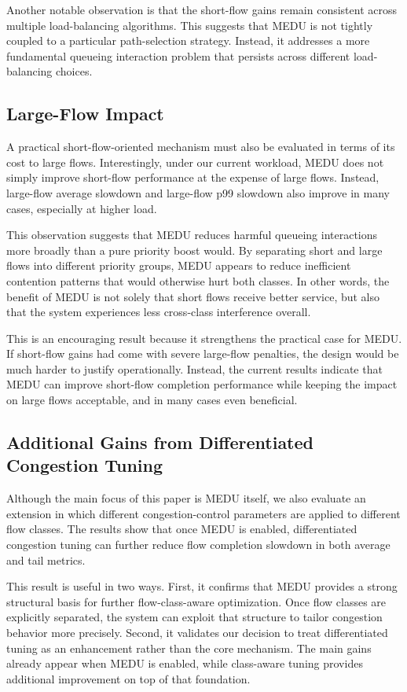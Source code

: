 \documentclass[conference]{IEEEtran}
\begin{document}
Another notable observation is that the short-flow gains remain consistent across multiple load-balancing algorithms. This suggests that MEDU is not tightly coupled to a particular path-selection strategy. Instead, it addresses a more fundamental queueing interaction problem that persists across different load-balancing choices.

\subsection{Large-Flow Impact}

A practical short-flow-oriented mechanism must also be evaluated in terms of its cost to large flows. Interestingly, under our current workload, MEDU does not simply improve short-flow performance at the expense of large flows. Instead, large-flow average slowdown and large-flow p99 slowdown also improve in many cases, especially at higher load.

This observation suggests that MEDU reduces harmful queueing interactions more broadly than a pure priority boost would. By separating short and large flows into different priority groups, MEDU appears to reduce inefficient contention patterns that would otherwise hurt both classes. In other words, the benefit of MEDU is not solely that short flows receive better service, but also that the system experiences less cross-class interference overall.

This is an encouraging result because it strengthens the practical case for MEDU. If short-flow gains had come with severe large-flow penalties, the design would be much harder to justify operationally. Instead, the current results indicate that MEDU can improve short-flow completion performance while keeping the impact on large flows acceptable, and in many cases even beneficial.

\subsection{Additional Gains from Differentiated Congestion Tuning}

Although the main focus of this paper is MEDU itself, we also evaluate an extension in which different congestion-control parameters are applied to different flow classes. The results show that once MEDU is enabled, differentiated congestion tuning can further reduce flow completion slowdown in both average and tail metrics.

This result is useful in two ways. First, it confirms that MEDU provides a strong structural basis for further flow-class-aware optimization. Once flow classes are explicitly separated, the system can exploit that structure to tailor congestion behavior more precisely. Second, it validates our decision to treat differentiated tuning as an enhancement rather than the core mechanism. The main gains already appear when MEDU is enabled, while class-aware tuning provides additional improvement on top of that foundation.
\end{document}
